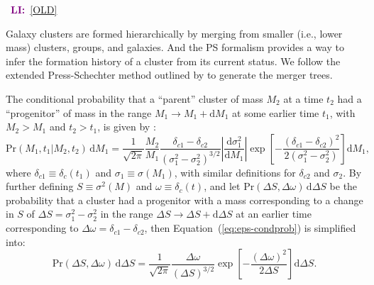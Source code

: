\documentclass[modern]{aastex61}
\newcommand{\R}[1]{\mathrm{#1}}
\newcommand{\D}[1]{\R{d} #1}
\newcommand{\diff}[2]{\frac{\D{#1}}{\D{#2}}}
\newcommand{\LI}[1]{\textcolor{purple}{\textbf{LI:}}~\uline{#1}}
\begin{document}
\noindent\hrulefill~\LI{[OLD]}~\hrulefill

Galaxy clusters are formed hierarchically by merging from smaller (i.e.,
lower mass) clusters, groups, and galaxies.
And the PS formalism provides a way to infer the formation history
of a cluster from its current status.
We follow the extended Press-Schechter method outlined by \citet{lacey1993}
to generate the merger trees.

The conditional probability that a \enquote{parent} cluster of mass $M_2$
at a time $t_2$ had a \enquote{progenitor} of mass in the range
$M_1 \to M_1 + \D{M_1}$ at some earlier time $t_1$,
with $M_2 > M_1$ and $t_2 > t_1$, is given by
\citep{lacey1993,randall2002}:
\begin{equation}
  \label{eq:eps-condprob}
  \R{Pr}(M_1, t_1 | M_2, t_2) \,\D{M_1} = \frac{1}{\sqrt{2\pi}} \frac{M_2}{M_1}
  \frac{\delta_{c1} - \delta_{c2}}{(\sigma_1^2 - \sigma_2^2)^{3/2}}
  \left| \diff{\sigma_1^2}{M_1} \right|
  \exp \!\left[ -\frac{(\delta_{c1} - \delta_{c2})^2}
    {2(\sigma_1^2 - \sigma_2^2)} \right] \D{M_1},
\end{equation}
where
$\delta_{c1} \equiv \delta_c(t_1)$ and $\sigma_1 \equiv \sigma(M_1)$,
with similar definitions for $\delta_{c2}$ and $\sigma_2$.
By further defining $S \equiv \sigma^2(M)$ and $\omega \equiv \delta_c(t)$,
and let $\R{Pr}(\Delta S, \Delta \omega) \,\D{\Delta S}$ be the probability
that a cluster had a progenitor with a mass corresponding to a change
in $S$ of $\Delta S = \sigma_1^2 - \sigma_2^2$ in the range
$\Delta S \to \Delta S + \D{\Delta S}$ at an earlier time
corresponding to $\Delta \omega = \delta_{c1} - \delta_{c2}$,
then Equation~(\ref{eq:eps-condprob}) is simplified into:
\begin{equation}
  \label{eq:eps-condprob-simp}
  \R{Pr}(\Delta S, \Delta \omega) \,\D{\Delta S} = \frac{1}{\sqrt{2\pi}}
  \frac{\Delta\omega}{(\Delta S)^{3/2}}
  \exp \!\left[ -\frac{(\Delta\omega)^2}{2 \Delta S} \right] \D{\Delta S}.
\end{equation}
\end{document}
